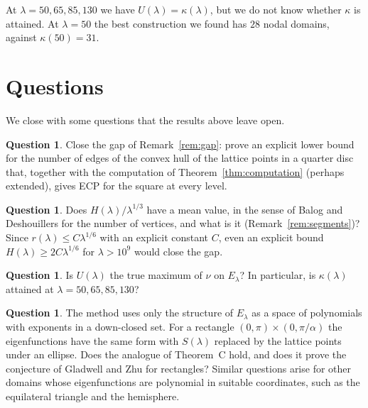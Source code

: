 \documentclass[11pt]{amsart}
\theoremstyle{definition}
\newtheorem{question}[theorem]{Question}
\theoremstyle{remark}
\newcommand{\SweepX}{10^9}
\numberwithin{equation}{section}
\begin{document}
At $\lambda=50,65,85,130$ we have $U(\lambda)=\kappa(\lambda)$, but we do not know whether
$\kappa$ is attained. At $\lambda=50$ the best construction we found has $28$ nodal domains,
against $\kappa(50)=31$.

\section{Questions}\label{sec:questions}

We close with some questions that the results above leave open.

\begin{question}
Close the gap of Remark~\ref{rem:gap}: prove an explicit lower bound for the number of edges of
the convex hull of the lattice points in a quarter disc that, together with the computation of
Theorem~\ref{thm:computation} (perhaps extended), gives ECP for the square at every level.
\end{question}

\begin{question}
Does $H(\lambda)/\lambda^{1/3}$ have a mean value, in the sense of Balog and Deshouillers
\cite{BalogDeshouillers} for the number of vertices, and what is it
(Remark~\ref{rem:segments})? Since $r(\lambda)\le C\lambda^{1/6}$ with an explicit constant
$C$, even an explicit bound $H(\lambda)\ge2C\lambda^{1/6}$ for $\lambda>\SweepX$ would close
the gap.
\end{question}

\begin{question}
Is $U(\lambda)$ the true maximum of $\nu$ on $E_\lambda$? In particular, is $\kappa(\lambda)$
attained at $\lambda=50,65,85,130$?
\end{question}

\begin{question}
The method uses only the structure of $E_\lambda$ as a space of polynomials with exponents in a
down-closed set. For a rectangle $(0,\pi)\times(0,\pi/\alpha)$ the eigenfunctions have the same
form with $S(\lambda)$ replaced by the lattice points under an ellipse. Does the analogue of
Theorem~C hold, and does it prove the conjecture of Gladwell and Zhu for rectangles? Similar
questions arise for other domains whose eigenfunctions are polynomial in suitable coordinates,
such as the equilateral triangle and the hemisphere.
\end{question}

\appendix
\end{document}
